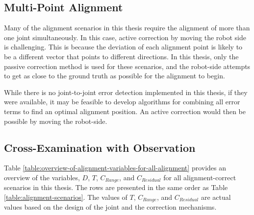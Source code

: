 \subsection{Multi-Point Alignment}
\label{subsection:new-hypo-multi-point-alignment}

Many of the alignment scenarios in this thesis require the alignment of more than one joint simultaneously. In this case, active correction by moving the robot side is challenging. This is because the deviation of each alignment point is likely to be a different vector that points to different directions. In this thesis, only the passive correction method is used for these scenarios, and the robot-side attempts to get as close to the ground truth as possible for the alignment to begin.

While there is no joint-to-joint error detection implemented in this thesis, if they were available, it may be feasible to develop algorithms for combining all error terms to find an optimal alignment position. An active correction would then be possible by moving the robot-side.

\subsection{Cross-Examination with Observation}
\label{subsection:new-hypo-cross-examination-with-observation}

Table \ref{table:overview-of-alignment-variables-for-all-alignment} provides an overview of the variables, $D$, $T$, $C_{Range}$, and $C_{Residual}$ for all alignment-correct scenarios in this thesis. The rows are presented in the same order as Table \ref{table:alignment-scenarios}. The values of $T$, $C_{Range}$, and $C_{Residual}$ are actual values based on the design of the joint and the correction mechanisms.

